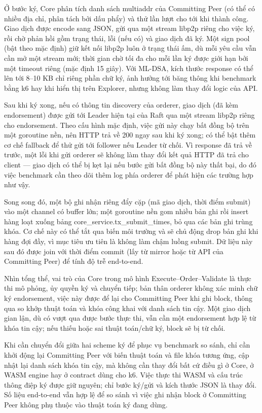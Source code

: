 Ở bước ký, Core phân tích danh sách multiaddr của Committing Peer (có thể có
nhiều địa chỉ, phân tách bởi dấu phẩy) và thử lần lượt cho tới khi thành công.
Giao dịch được encode sang JSON, gửi qua một stream libp2p riêng cho việc ký,
rồi chờ phản hồi gồm trạng thái, lỗi (nếu có) và giao dịch đã ký. Một sign pool
(bật theo mặc định) giữ kết nối libp2p luôn ở trạng thái ấm, dù mỗi yêu cầu vẫn
cần mở một stream mới; thời gian chờ tối đa cho mỗi lần ký được giới hạn bởi
một timeout riêng (mặc định 15 giây). Với ML-DSA, kích thước response có thể
lên tới 8--10 KB chỉ riêng phần chữ ký, ảnh hưởng tới băng thông khi benchmark
bằng k6 hay khi hiển thị trên Explorer, nhưng không làm thay đổi logic của API.

Sau khi ký xong, nếu có thông tin discovery của orderer, giao dịch (đã kèm
endorsement) được gửi tới Leader hiện tại của Raft qua một stream libp2p riêng
cho endorsement. Theo cấu hình mặc định, việc gửi này chạy bất đồng bộ trên một
goroutine nền, nên HTTP trả về 200 ngay sau khi ký xong; có thể bật thêm cơ chế
fallback để thử gửi tới follower nếu Leader từ chối. Vì response đã trả về
trước, một lỗi khi gửi orderer sẽ không làm thay đổi kết quả HTTP đã trả cho
client --- giao dịch có thể bị kẹt lại nếu bước gửi bất đồng bộ này thất bại, do
đó việc benchmark cần theo dõi thêm log phía orderer để phát hiện các trường
hợp như vậy.

Song song đó, một bộ ghi nhận riêng đẩy cặp (mã giao dịch, thời điểm submit)
vào một channel có buffer lớn; một goroutine nền gom nhiều bản ghi rồi insert
hàng loạt xuống bảng core\_service.tx\_submit\_times, bỏ qua các bản
ghi trùng khóa. Cơ chế này có thể tắt qua biến môi trường và sẽ chủ động drop
bản ghi khi hàng đợi đầy, vì mục tiêu ưu tiên là không làm chậm luồng submit.
Dữ liệu này sau đó được join với thời điểm commit (lấy từ mirror hoặc từ API
của Committing Peer) để tính độ trễ end-to-end.

Nhìn tổng thể, vai trò của Core trong mô hình Execute--Order--Validate là thực
thi mô phỏng, ủy quyền ký và chuyển tiếp; bản thân orderer không xác minh chữ
ký endorsement, việc này được để lại cho Committing Peer khi ghi block, thông
qua so khớp thuật toán và khóa công khai với danh sách tin cậy. Một giao dịch
gian lận, dù có vượt qua được bước thực thi, vẫn cần một endorsement hợp lệ từ
khóa tin cậy; nếu thiếu hoặc sai thuật toán/chữ ký, block sẽ bị từ chối.

Khi cần chuyển đổi giữa hai scheme ký để phục vụ benchmark so sánh, chỉ cần
khởi động lại Committing Peer với biến thuật toán và file khóa tương ứng, cập
nhật lại danh sách khóa tin cậy, mà không cần thay đổi bất cứ điều gì ở Core,
ở WASM engine hay ở contract dùng cho k6. Việc thực thi WASM và cấu trúc thông
điệp ký được giữ nguyên; chỉ bước ký/gửi và kích thước JSON là thay đổi. Số
liệu end-to-end vẫn hợp lệ để so sánh vì việc ghi nhận block ở Committing Peer
không phụ thuộc vào thuật toán ký đang dùng.

